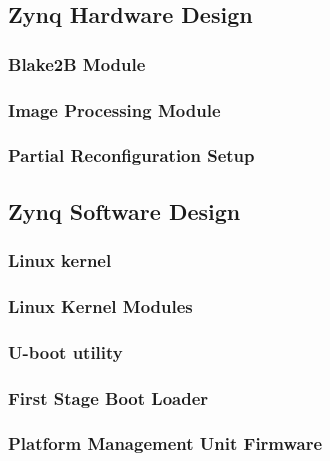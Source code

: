 \subsection{Zynq Hardware Design}\label{ssec:zynqhardwaredesign}

%
\subsubsection{Blake2B Module}\label{sssec:blake2bmodule}

%
\subsubsection{Image Processing Module}\label{sssec:imageprocessingmodule}

%
\subsubsection{Partial Reconfiguration Setup}\label{sssec:partialreconfigurationsetup}



\subsection{Zynq Software Design}\label{ssec:zynqsoftwaredesign}

%
\subsubsection{Linux kernel}\label{sssec:linuxkernel}

%
\subsubsection{Linux Kernel Modules}\label{sssec:linuxkernelmodules}

%
\subsubsection{U-boot utility}\label{sssec:uboot}

%
\subsubsection{First Stage Boot Loader}\label{sssec:fsbl}

%
\subsubsection{Platform Management Unit Firmware}\label{sssec:pmuf}

%
